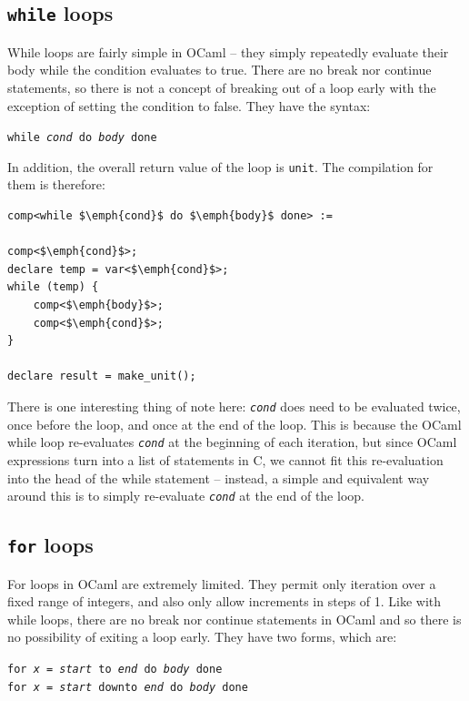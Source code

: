 \documentclass[12pt,a4paper,twoside,openright]{report}
\begin{document}
\subsection{\texttt{while} loops}

While loops are fairly simple in OCaml -- they simply repeatedly evaluate their 
body while the condition evaluates to true. There are no break nor continue 
statements, so there is not a concept of breaking out of a loop early with the 
exception of setting the condition to false. They have the syntax:

\begin{center}
    \texttt{while \emph{cond} do \emph{body} done}
\end{center}

In addition, the overall return value of the loop is \texttt{unit}. The
compilation for them is therefore: 

\begin{lstlisting}
comp<while $\emph{cond}$ do $\emph{body}$ done> :=

comp<$\emph{cond}$>;
declare temp = var<$\emph{cond}$>;
while (temp) {
    comp<$\emph{body}$>;
    comp<$\emph{cond}$>;
}

declare result = make_unit();
\end{lstlisting}

There is one interesting thing of note here: \texttt{\emph{cond}} does need to 
be evaluated twice, once before the loop, and once at the end of the loop. This 
is because the OCaml while loop re-evaluates \texttt{\emph{cond}} at the 
beginning of each iteration, but since OCaml expressions turn into a list of 
statements in C, we cannot fit this re-evaluation into the head of the while 
statement -- instead, a simple and equivalent way around this is to simply 
re-evaluate \texttt{\emph{cond}} at the end of the loop.

\subsection{\texttt{for} loops}

For loops in OCaml are extremely limited. They permit only iteration over a 
fixed range of integers, and also only allow increments in steps of 1. Like 
with while loops, there are no break nor continue statements in OCaml and so 
there is no possibility of exiting a loop early. They have two forms, which are:

\begin{center}
\texttt{for \emph{x} = \emph{start} to \emph{end} do \emph{body} done}\\
\texttt{for \emph{x} = \emph{start} downto \emph{end} do \emph{body} done}\\
\end{center}
\end{document}
